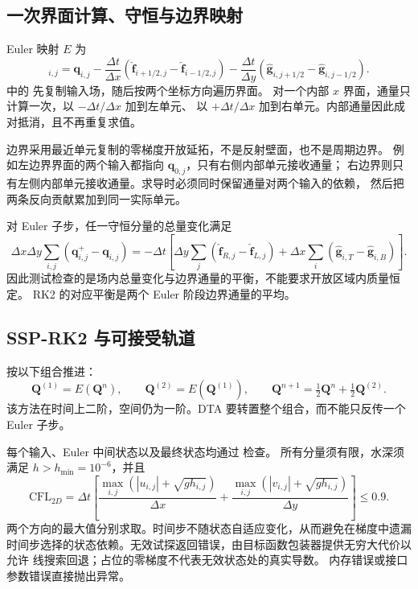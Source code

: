 \documentclass[12pt,a4paper]{article}
\newcommand{\Q}{\mathbf{Q}}
\newcommand{\q}{\mathbf{q}}
\begin{document}
\subsection{一次界面计算、守恒与边界映射}

Euler 映射 $E$ 为
\begin{equation}
 [E(\Q)]_{i,j}=\q_{i,j}
 -\frac{\Delta t}{\Delta x}(\widehat{\mathbf f}_{i+1/2,j}-\widehat{\mathbf f}_{i-1/2,j})
 -\frac{\Delta t}{\Delta y}(\widehat{\mathbf g}_{i,j+1/2}-\widehat{\mathbf g}_{i,j-1/2}).
 \label{eq:dta-euler}
\end{equation}
 中的  先复制输入场，随后按两个坐标方向遍历界面。
对一个内部 $x$ 界面，通量只计算一次，以 $-\Delta t/\Delta x$ 加到左单元、
以 $+\Delta t/\Delta x$ 加到右单元。内部通量因此成对抵消，且不再重复求值。

边界采用最近单元复制的零梯度开放延拓，不是反射壁面，也不是周期边界。
例如左边界界面的两个输入都指向 $\q_{0,j}$，只有右侧内部单元接收通量；
右边界则只有左侧内部单元接收通量。求导时必须同时保留通量对两个输入的依赖，
然后把两条反向贡献累加到同一实际单元。

对 Euler 子步，任一守恒分量的总量变化满足
\begin{equation}
 \Delta x\Delta y\sum_{i,j}(\q^+_{i,j}-\q_{i,j})
 =-\Delta t\left[
 \Delta y\sum_j(\widehat{\mathbf f}_{R,j}-\widehat{\mathbf f}_{L,j})
 +\Delta x\sum_i(\widehat{\mathbf g}_{i,T}-\widehat{\mathbf g}_{i,B})\right].
 \label{eq:dta-conservation}
\end{equation}
因此测试检查的是场内总量变化与边界通量的平衡，不能要求开放区域内质量恒定。
RK2 的对应平衡是两个 Euler 阶段边界通量的平均。

\subsection{SSP-RK2 与可接受轨道}

 按以下组合推进：
\begin{equation}
 \Q^{(1)}=E(\Q^n),\qquad
 \Q^{(2)}=E(\Q^{(1)}),\qquad
 \Q^{n+1}=\tfrac12\Q^n+\tfrac12\Q^{(2)}.
 \label{eq:dta-rk2}
\end{equation}
该方法在时间上二阶，空间仍为一阶。DTA 要转置整个组合，而不能只反传一个 Euler 子步。

每个输入、Euler 中间状态以及最终状态均通过  检查。
所有分量须有限，水深须满足 $h>h_{\min}=10^{-6}$，并且
\begin{equation}
 \mathrm{CFL}_{2D}=\Delta t\left[
 \frac{\max_{i,j}(|u_{i,j}|+\sqrt{gh_{i,j}})}{\Delta x}
 +\frac{\max_{i,j}(|v_{i,j}|+\sqrt{gh_{i,j}})}{\Delta y}
 \right]\le0.9.
 \label{eq:dta-cfl}
\end{equation}
两个方向的最大值分别求取。时间步不随状态自适应变化，从而避免在梯度中遗漏
时间步选择的状态依赖。无效试探返回错误，由目标函数包装器提供无穷大代价以允许
线搜索回退；占位的零梯度不代表无效状态处的真实导数。
内存错误或接口参数错误直接抛出异常。
\end{document}
